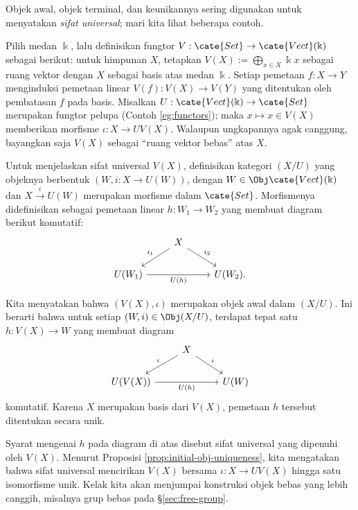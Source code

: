 Objek awal, objek terminal, dan keunikannya sering digunakan untuk menyatakan \emph{sifat universal}; mari kita lihat beberapa contoh.
\begin{example}\label{eg:free-vectorspace}
	Pilih medan $\Bbbk$, lalu definisikan fungtor $V: \cate{Set} \to \cate{Vect}(\Bbbk)$ sebagai berikut: untuk himpunan $X$, tetapkan $V(X) := \bigoplus_{x \in X} \Bbbk x$ sebagai ruang vektor dengan $X$ sebagai basis atas medan $\Bbbk$. Setiap pemetaan $f: X \to Y$ menginduksi pemetaan linear $V(f): V(X) \to V(Y)$ yang ditentukan oleh pembatasan $f$ pada basis. Misalkan $U: \cate{Vect}(\Bbbk) \to \cate{Set}$ merupakan fungtor pelupa (Contoh \ref{eg:functors}); maka $x \mapsto x \in V(X)$ memberikan morfisme $\iota: X \to UV(X)$. Walaupun ungkapannya agak canggung, bayangkan saja $V(X)$ sebagai ``ruang vektor bebas'' atas $X$.

	Untuk menjelaskan sifat universal $V(X)$, definisikan kategori $(X / U)$ yang objeknya berbentuk $(W, i: X \to U(W))$, dengan $W \in \Obj \cate{Vect}(\Bbbk)$ dan $X \xrightarrow{i} U(W)$ merupakan morfisme dalam $\cate{Set}$. Morfismenya didefinisikan sebagai pemetaan linear $h: W_1 \to W_2$ yang membuat diagram berikut komutatif:
	\[ \begin{tikzcd}
		{} & X \arrow[ld, "i_1"'] \arrow[rd, "i_2"] & \\
		U(W_1) \arrow[rr, "U(h)"'] & & U(W_2).
  \end{tikzcd} \]

	Kita menyatakan bahwa $(V(X), \iota)$ merupakan objek awal dalam $(X / U)$. Ini berarti bahwa untuk setiap $(W, i) \in \Obj(X / U)$, terdapat tepat satu $h: V(X) \to W$ yang membuat diagram
	\[\begin{tikzcd}
		{} & X \arrow[ld, "\iota"'] \arrow[rd, "i"] & \\
		U(V(X)) \arrow[rr, "U(h)"'] & & U(W)
	\end{tikzcd}\]
	komutatif. Karena $X$ merupakan basis dari $V(X)$, pemetaan $h$ tersebut ditentukan secara unik.

	Syarat mengenai $h$ pada diagram di atas disebut sifat universal yang dipenuhi oleh $V(X)$. Menurut Proposisi \ref{prop:initial-obj-uniqueness}, kita mengatakan bahwa sifat universal mencirikan $V(X)$ bersama $\iota: X \to UV(X)$ hingga satu isomorfisme unik. Kelak kita akan menjumpai konstruksi objek bebas yang lebih canggih, misalnya grup bebas pada \S\ref{sec:free-group}.
\end{example}


